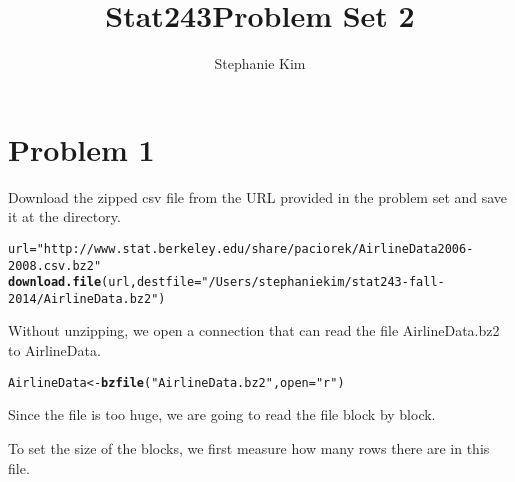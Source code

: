 \documentclass[english]{article}\usepackage[]{graphicx}\usepackage[]{color}
\makeatletter
\newcommand{\hlstr}[1]{\textcolor[rgb]{0.192,0.494,0.8}{#1}}%
\newcommand{\hlstd}[1]{\textcolor[rgb]{0.345,0.345,0.345}{#1}}%
\newcommand{\hlkwb}[1]{\textcolor[rgb]{0.69,0.353,0.396}{#1}}%
\newcommand{\hlkwc}[1]{\textcolor[rgb]{0.333,0.667,0.333}{#1}}%
\newcommand{\hlkwd}[1]{\textcolor[rgb]{0.737,0.353,0.396}{\textbf{#1}}}%
\newenvironment{kframe}{%
 \def\at@end@of@kframe{}%
 \ifinner\ifhmode%
  \def\at@end@of@kframe{\end{minipage}}%
  \begin{minipage}{\columnwidth}%
 \fi\fi%
 \def\FrameCommand##1{\hskip\@totalleftmargin \hskip-\fboxsep
 \colorbox{shadecolor}{##1}\hskip-\fboxsep
     \hskip-\linewidth \hskip-\@totalleftmargin \hskip\columnwidth}%
 \MakeFramed {\advance\hsize-\width
   \@totalleftmargin\z@ \linewidth\hsize
   \@setminipage}}%
 {\par\unskip\endMakeFramed%
 \at@end@of@kframe}
\newenvironment{knitrout}{}{} %
\makeatother
\begin{document}
\title{Stat243}


\title{Problem Set 2}


\author{Stephanie Kim}

\maketitle
\raggedright


\section*{Problem 1}

Download the zipped csv file from the URL provided in the problem
set and save it at the directory.

\begin{knitrout}
\color{fgcolor}\begin{kframe}
\begin{alltt}
\hlstd{url}\hlkwb{=}\hlstr{"http://www.stat.berkeley.edu/share/paciorek/AirlineData2006-2008.csv.bz2"}
\hlkwd{download.file}\hlstd{(url,} \hlkwc{destfile}\hlstd{=}\hlstr{"/Users/stephaniekim/stat243-fall-2014/AirlineData.bz2"}\hlstd{)}
\end{alltt}
\end{kframe}
\end{knitrout}

Without unzipping, we open a connection that can read the file AirlineData.bz2
to AirlineData.

\begin{knitrout}
\color{fgcolor}\begin{kframe}
\begin{alltt}
\hlstd{AirlineData} \hlkwb{<-} \hlkwd{bzfile}\hlstd{(}\hlstr{"AirlineData.bz2"}\hlstd{,} \hlkwc{open}\hlstd{=}\hlstr{"r"}\hlstd{)}
\end{alltt}
\end{kframe}
\end{knitrout}

Since the file is too huge, we are going to read the file block by
block.

To set the size of the blocks, we first measure how many rows there
are in this file.
\end{document}
